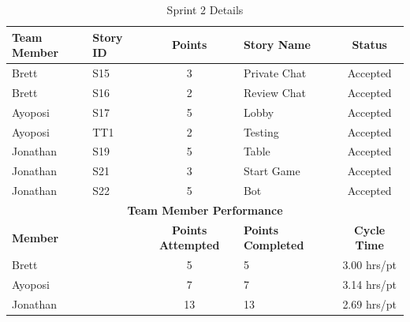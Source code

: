 \begin{table}[h]
\centering
\caption{Sprint 2 Details}
\label{tab:sprint-2-details}
\begin{tabular}{|l|l|c|p{4cm}|c|}
\hline
\textbf{Team Member} & \textbf{Story ID} & \textbf{Points} & \textbf{Story Name} & \textbf{Status} \\
\hline
Brett & S15 & 3 & Private Chat & Accepted \\
Brett & S16 & 2 & Review Chat & Accepted \\
Ayoposi & S17 & 5 & Lobby & Accepted \\
Ayoposi & TT1 & 2 & Testing & Accepted \\
Jonathan & S19 & 5 & Table & Accepted \\
Jonathan & S21 & 3 & Start Game & Accepted \\
Jonathan & S22 & 5 & Bot & Accepted \\
\hline
\multicolumn{5}{|c|}{\textbf{Team Member Performance}} \\
\hline
\multicolumn{2}{|l|}{\textbf{Member}} & \textbf{Points Attempted} & \textbf{Points Completed} & \textbf{Cycle Time} \\
\hline
\multicolumn{2}{|l|}{Brett} & 5 & 5 & 3.00 hrs/pt \\
\multicolumn{2}{|l|}{Ayoposi} & 7 & 7 & 3.14 hrs/pt \\
\multicolumn{2}{|l|}{Jonathan} & 13 & 13 & 2.69 hrs/pt \\
\hline
\end{tabular}
\end{table}


